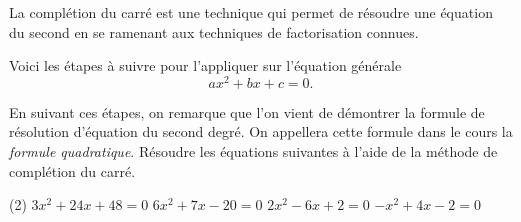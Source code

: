\documentclass[a4paper,12pt]{report}
\begin{document}
La complétion du carré est une technique qui permet de résoudre une équation du second en se ramenant aux techniques de factorisation connues.
\begin{boiteExT}[$x^2-8x+4=0$]
	\vspace{10cm}	

\end{boiteExT}

\begin{boiteExT}[$2x^2+3x-2=0$]
	\vspace{10cm}	

\end{boiteExT}
\newpage
Voici les étapes à suivre pour l'appliquer sur l'équation générale 
\[ax^2+bx+c=0.\]
\begin{boiteExT}
	\vspace{18cm}
\end{boiteExT}
En suivant ces étapes, on remarque que l'on vient de démontrer la formule de résolution d'équation du second degré. On appellera cette formule dans le cours la \emph{formule quadratique}.
Résoudre les équations suivantes à l'aide de la méthode de complétion du carré.
\begin{tasks}(2)
 \task $3 x^2+24 x+48=0$
 \task $6 x^2+7 x-20=0$
 \task $2 x^2-6 x+2=0$
 \task $-x^2+4 x-2=0$
\end{tasks}
\end{document}
